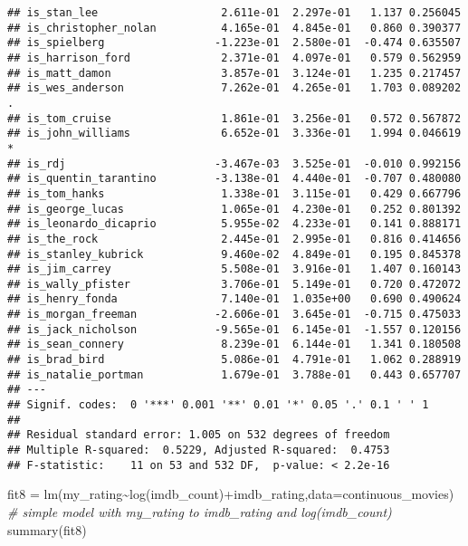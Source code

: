 \documentclass[
]{article}
\newenvironment{Shaded}{\begin{snugshade}}{\end{snugshade}}
\newcommand{\AttributeTok}[1]{\textcolor[rgb]{0.77,0.63,0.00}{#1}}
\newcommand{\CommentTok}[1]{\textcolor[rgb]{0.56,0.35,0.01}{\textit{#1}}}
\newcommand{\FunctionTok}[1]{\textcolor[rgb]{0.00,0.00,0.00}{#1}}
\newcommand{\NormalTok}[1]{#1}
\newcommand{\OtherTok}[1]{\textcolor[rgb]{0.56,0.35,0.01}{#1}}
\newcommand{\SpecialCharTok}[1]{\textcolor[rgb]{0.00,0.00,0.00}{#1}}
\begin{document}
\begin{verbatim}
## is_stan_lee                   2.611e-01  2.297e-01   1.137 0.256045    
## is_christopher_nolan          4.165e-01  4.845e-01   0.860 0.390377    
## is_spielberg                 -1.223e-01  2.580e-01  -0.474 0.635507    
## is_harrison_ford              2.371e-01  4.097e-01   0.579 0.562959    
## is_matt_damon                 3.857e-01  3.124e-01   1.235 0.217457    
## is_wes_anderson               7.262e-01  4.265e-01   1.703 0.089202 .  
## is_tom_cruise                 1.861e-01  3.256e-01   0.572 0.567872    
## is_john_williams              6.652e-01  3.336e-01   1.994 0.046619 *  
## is_rdj                       -3.467e-03  3.525e-01  -0.010 0.992156    
## is_quentin_tarantino         -3.138e-01  4.440e-01  -0.707 0.480080    
## is_tom_hanks                  1.338e-01  3.115e-01   0.429 0.667796    
## is_george_lucas               1.065e-01  4.230e-01   0.252 0.801392    
## is_leonardo_dicaprio          5.955e-02  4.233e-01   0.141 0.888171    
## is_the_rock                   2.445e-01  2.995e-01   0.816 0.414656    
## is_stanley_kubrick            9.460e-02  4.849e-01   0.195 0.845378    
## is_jim_carrey                 5.508e-01  3.916e-01   1.407 0.160143    
## is_wally_pfister              3.706e-01  5.149e-01   0.720 0.472072    
## is_henry_fonda                7.140e-01  1.035e+00   0.690 0.490624    
## is_morgan_freeman            -2.606e-01  3.645e-01  -0.715 0.475033    
## is_jack_nicholson            -9.565e-01  6.145e-01  -1.557 0.120156    
## is_sean_connery               8.239e-01  6.144e-01   1.341 0.180508    
## is_brad_bird                  5.086e-01  4.791e-01   1.062 0.288919    
## is_natalie_portman            1.679e-01  3.788e-01   0.443 0.657707    
## ---
## Signif. codes:  0 '***' 0.001 '**' 0.01 '*' 0.05 '.' 0.1 ' ' 1
## 
## Residual standard error: 1.005 on 532 degrees of freedom
## Multiple R-squared:  0.5229, Adjusted R-squared:  0.4753 
## F-statistic:    11 on 53 and 532 DF,  p-value: < 2.2e-16
\end{verbatim}

\begin{Shaded}
\begin{Highlighting}[]
\NormalTok{fit8 }\OtherTok{=} \FunctionTok{lm}\NormalTok{(my\_rating}\SpecialCharTok{\textasciitilde{}}\FunctionTok{log}\NormalTok{(imdb\_count)}\SpecialCharTok{+}\NormalTok{imdb\_rating,}\AttributeTok{data=}\NormalTok{continuous\_movies) }\CommentTok{\# simple model with my\_rating to imdb\_rating and log(imdb\_count)}
\FunctionTok{summary}\NormalTok{(fit8)}
\end{Highlighting}
\end{Shaded}
\end{document}
